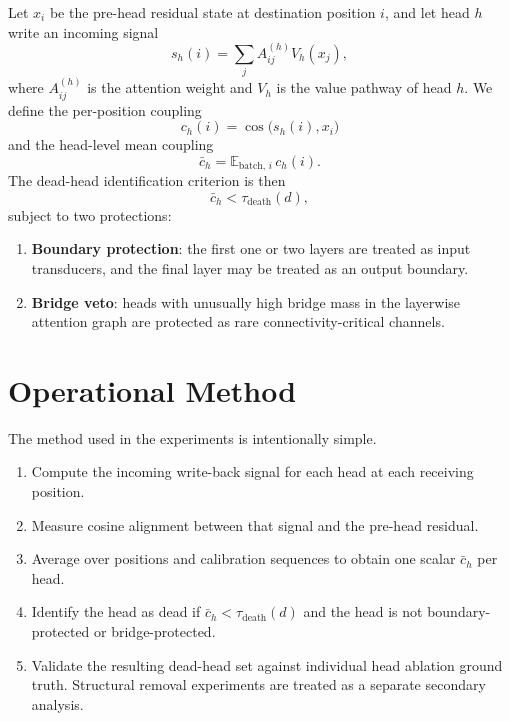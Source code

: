 \documentclass[aps,prd,onecolumn,superscriptaddress,showpacs,12pt]{revtex4-2}
\newcommand{\taudeath}{\tau_{\mathrm{death}}}
\newcommand{\writeback}{s_h(i)}
\newcommand{\meancoupling}{\bar{c}_h}
\begin{document}
Let $x_i$ be the pre-head residual state at destination position $i$, and let head
$h$ write an incoming signal
\begin{equation}
\writeback = \sum_j A_{ij}^{(h)} V_h(x_j),
\end{equation}
where $A_{ij}^{(h)}$ is the attention weight and $V_h$ is the value pathway of
head $h$. We define the per-position coupling
\begin{equation}
c_h(i)=\cos\!\bigl(\writeback, x_i\bigr)
\end{equation}
and the head-level mean coupling
\begin{equation}
\meancoupling = \mathbb{E}_{\mathrm{batch},\,i}\, c_h(i).
\end{equation}
The dead-head identification criterion is then
\begin{equation}
\meancoupling < \taudeath(d),
\end{equation}
subject to two protections:
\begin{enumerate}
\item \textbf{Boundary protection}: the first one or two layers are treated as
input transducers, and the final layer may be treated as an output boundary.
\item \textbf{Bridge veto}: heads with unusually high bridge mass in the layerwise
attention graph are protected as rare connectivity-critical channels.
\end{enumerate}

\section{Operational Method}

The method used in the experiments is intentionally simple.

\begin{enumerate}
\item Compute the incoming write-back signal for each head at each receiving
position.
\item Measure cosine alignment between that signal and the pre-head residual.
\item Average over positions and calibration sequences to obtain one scalar
$\meancoupling$ per head.
\item Identify the head as dead if $\meancoupling < \taudeath(d)$ and the head is
not boundary-protected or bridge-protected.
\item Validate the resulting dead-head set against individual head ablation
ground truth. Structural removal experiments are treated as a separate secondary
analysis.
\end{enumerate}
\end{document}
